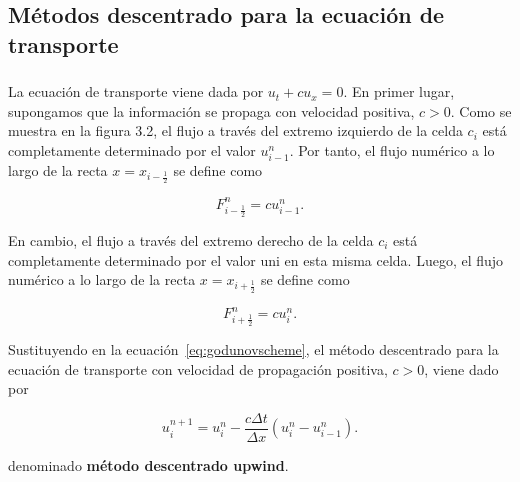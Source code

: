 \subsection{Métodos descentrado para la ecuación de transporte}

\begin{frame}
    \frametitle{\subsecname}

    La ecuación de transporte viene dada por $u_{t}+cu_{x}=0$.
    En primer lugar, supongamos que la información se propaga con
    velocidad positiva, $c>0$.
    Como se muestra en la figura 3.2, el flujo a través del extremo
    izquierdo de la celda $c_{i}$ está completamente determinado por el
    valor $u^{n}_{i-1}$.
    Por tanto, el flujo numérico a lo largo de la recta
    $x=x_{i-\frac{1}{2}}$ se define como

    \begin{equation*}
        F^{n}_{i-\frac{1}{2}}=
        cu^{n}_{i-1}.
    \end{equation*}

    En cambio, el flujo a través del extremo derecho de la celda $c_{i}$
    está completamente determinado por el valor uni en esta misma celda.
    Luego, el flujo numérico a lo largo de la recta $x=x_{i+\frac{1}{2}}$
    se define como

    \begin{equation*}
        F^{n}_{i+\frac{1}{2}}=
        cu^{n}_{i}.
    \end{equation*}

    Sustituyendo en la ecuación~\eqref{eq:godunovscheme}, el método
    descentrado para la ecuación de transporte con velocidad de
    propagación positiva, $c>0$, viene dado por

    \begin{equation}\label{eq:upwind}
        u^{n+1}_{i}=
        u^{n}_{i}-
        \frac{c\Delta t}{\Delta x}
        \left(
        u^{n}_{i}-
        u^{n}_{i-1}
        \right).
    \end{equation}

    denominado \textbf{método descentrado upwind}.
\end{frame}

